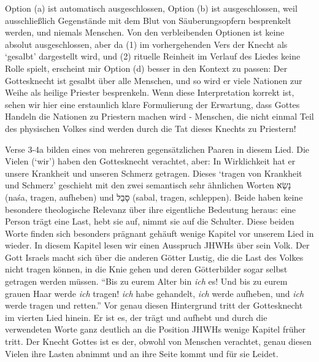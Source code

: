 Option (a) ist automatisch ausgeschlossen, Option (b) ist ausgeschlossen, weil ausschließlich Gegenstände mit dem Blut von Säuberungsopfern besprenkelt werden, und niemals Menschen.
Von den verbleibenden Optionen ist keine absolut ausgeschlossen, aber da (1) im vorhergehenden Vers der Knecht als `gesalbt' dargestellt wird, und (2) rituelle Reinheit im Verlauf des Liedes keine Rolle spielt, erscheint mir Option (d) besser in den Kontext zu passen:
Der Gottesknecht ist gesalbt über alle Menschen, und so wird er viele Nationen zur Weihe als heilige Priester besprenkeln.
Wenn diese Interpretation korrekt ist, sehen wir hier eine erstaunlich klare Formulierung der Erwartung, dass Gottes Handeln die Nationen zu Priestern machen wird
- Menschen, die nicht einmal Teil des physischen Volkes sind werden durch die Tat dieses Knechts zu Priestern!

Verse 3-4a bilden eines von mehreren gegensätzlichen Paaren in diesem Lied.
Die Vielen (`wir') haben den Gottesknecht verachtet, aber: In Wirklichkeit hat er unsere Krankheit und unseren Schmerz getragen.
Dieses `tragen von Krankheit und Schmerz' geschieht mit den zwei semantisch sehr ähnlichen Worten נָשַׂא (naśa, tragen, aufheben) und סָבַל (sabal, tragen, schleppen).
Beide haben keine besondere theologische Relevanz über ihre eigentliche Bedeutung heraus: eine Person trägt eine Last, hebt sie auf, nimmt sie auf die Schulter.
Diese beiden Worte finden sich besonders prägnant gehäuft wenige Kapitel vor unserem Lied in  wieder.
In diesem Kapitel lesen wir einen Ausspruch JHWHs über sein Volk.
Der Gott Israels macht sich über die anderen Götter Lustig, die die Last des Volkes nicht tragen können, in die Knie gehen und deren Götterbilder sogar selbst getragen werden müssen.
``Bis zu eurem Alter bin \textit{ich} es! Und bis zu eurem grauen Haar werde \textit{ich} tragen!
\textit{ich} habe gehandelt, \textit{ich} werde aufheben, und \textit{ich} werde tragen und retten.''
Vor genau diesen Hintergrund tritt der Gottesknecht im vierten Lied hinein.
Er ist es, der trägt und aufhebt und durch die verwendeten Worte ganz deutlich an die Position JHWHs wenige Kapitel früher tritt.
Der Knecht Gottes ist es der, obwohl von Menschen verachtet, genau diesen Vielen ihre Lasten abnimmt und an ihre Seite kommt und für sie Leidet.

